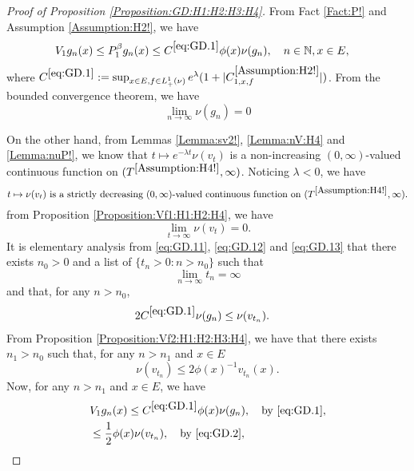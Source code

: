 \documentclass[12pt,a4paper]{amsart}
\numberwithin{equation}{section}
\theoremstyle{plain}
\theoremstyle{definition}
\theoremstyle{remark}
\newcounter{N}
\newcounter{n}[N]
\begin{document}
\begin{proof}[Proof of Proposition \ref{Proposition:GD:H1:H2:H3:H4}]
	\label{sec:GD}
From Fact \ref{Fact:P!} and Assumption \ref{Assumption:H2!}, we have
\begin{align}
\label{eq:GD.1}
&V_1 g_n(x) \leq P^\beta_1 g_n(x) \leq C^{\eqref{eq:GD.1}} \phi(x) \nu(g_n),
\quad n \in \mathbb N, x\in E,
\end{align}
where $C^{\eqref{eq:GD.1}}:= \sup_{x\in E, f\in L_+^1(\nu)}e^{\lambda }(1+|C^{\ref{Assumption:H2!}}_{1,x,f}|)$.
From the bounded convergence theorem, we have 
\begin{equation}
\label{eq:GD.11}
\lim_{n\to \infty} \nu(g_n) =0
\end{equation}

On the other hand, from Lemmas \ref{Lemma:sv2!}, \ref{Lemma:nV:H4} and \ref{Lemma:nuP!}, we know that $ t\mapsto e^{-\lambda t}\nu(v_t)$ is a non-increasing $(0,\infty)$-valued continuous function on $(T^{\ref{Assumption:H4!}},\infty)$.  
Noticing $\lambda <0$, we have 
\begin{equation}
\label{eq:GD.12}
\text{$ t\mapsto \nu(v_t)$ is a strictly decreasing $(0,\infty)$-valued continuous function on $(T^{\ref{Assumption:H4!}},\infty)$}.
\end{equation}
from Proposition \ref{Proposition:Vf1:H1:H2:H4}, we have 
\begin{equation}
\label{eq:GD.13}
\lim_{t\to \infty}\nu(v_t) =0.
\end{equation}
It is elementary analysis from \eqref{eq:GD.11}, \eqref{eq:GD.12} and \eqref{eq:GD.13} that there exists $n_0>0$ and a list of $\{t_n>0: n>n_0\}$ such that
\begin{equation}
\label{eq:GD.14}
\lim_{n\to \infty} t_n = \infty
\end{equation} 
and that, for any $n>n_0$,
\begin{align} \label{eq:GD.2}& 2C^{\eqref{eq:GD.1}} \nu(g_n) \leq \nu(v_{t_n}). \end{align}
From Proposition \ref{Proposition:Vf2:H1:H2:H3:H4}, we have that there exists $n_1 > n_0$ such that, for any $n>n_1$ and $x\in E$ 
\begin{equation}
\label{eq:GD.25}
\nu(v_{t_n})\leq 2\phi(x)^{-1} v_{t_n}(x).
\end{equation}
Now, for any $n>n_1$ and $x\in E$, we have
\begin{align} 
& V_1g_n(x) \leq C^{\eqref{eq:GD.1}} \phi(x)\nu(g_n),\quad\text{by \eqref{eq:GD.1}},
\\& \leq \frac{1}{2}\phi(x)\nu(v_{t_n}),\quad\text{by \eqref{eq:GD.2}},

\end{align}
\end{proof}
\end{document}
